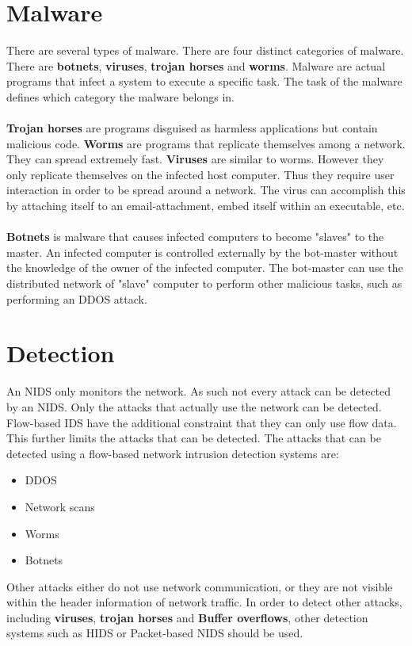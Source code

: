 \section{Malware}
There are several types of malware. There are four distinct categories of malware. There are \textbf{botnets}, \textbf{viruses}, \textbf{trojan horses} and \textbf{worms}. Malware are actual programs that infect a system to execute a specific task. The task of the malware defines which category the malware belongs in.\\
\\
\textbf{Trojan horses} are programs disguised as harmless applications but contain malicious code. \textbf{Worms} are programs that replicate themselves among a network.  They can spread extremely fast. \textbf{Viruses} are similar to worms. However they only replicate themselves on the infected host computer. Thus they require user interaction in order to be spread around a network. The virus can accomplish this by attaching itself to an email-attachment, embed itself within an executable, etc. \\
\\
\textbf{Botnets} is malware that causes infected computers to become "slaves" to the master. An infected computer is controlled externally by the bot-master without the knowledge of the owner of the infected computer. The bot-master can use the distributed network of "slave" computer to perform other malicious tasks, such as performing an DDOS attack. \cite{IPFlow}

\section{Detection}
An NIDS only monitors the network. As such not every attack can be detected by an NIDS. Only the attacks that actually use the network can be detected. Flow-based IDS have the additional constraint that they can only use flow data. This further limits the attacks that can be detected. The attacks that can be detected using a flow-based network intrusion detection systems are:
\begin{itemize}
\item DDOS
\item Network scans
\item Worms
\item Botnets
\end{itemize}
Other attacks either do not use network communication, or they are not visible within the header information of network traffic. In order to detect other attacks, including \textbf{viruses}, \textbf{trojan horses} and \textbf{Buffer overflows}, other detection systems such as HIDS or Packet-based NIDS should be used.

